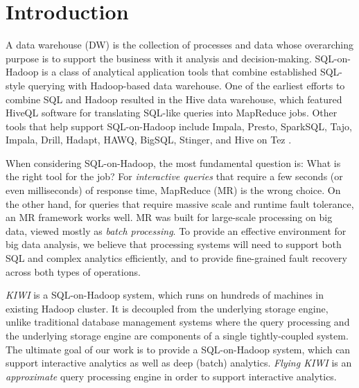 \documentclass{sig-alternate-05-2015}
\begin{document}


%
%

%
%
\printccsdesc



\section{Introduction}
A data warehouse (DW) is the collection of processes and data whose overarching purpose is to support the business with it analysis and decision-making. 
SQL-on-Hadoop is a class of analytical application tools that combine established SQL-style querying with Hadoop-based data warehouse.
One of the earliest efforts to combine SQL and Hadoop resulted in the Hive data warehouse, which featured HiveQL software for translating SQL-like queries into MapReduce jobs. Other tools that help support SQL-on-Hadoop include Impala, Presto, SparkSQL, Tajo, Impala, Drill, Hadapt, HAWQ, BigSQL, Stinger, and Hive on Tez \cite{Babcock:2003, Chaudhuri:2007, Zeng:2015, Floratou:2014, Agarwal:2014, Agarwal:2013}.

When considering SQL-on-Hadoop, the most fundamental question is: What is the right tool for the job? For \textit{interactive queries} that require a few seconds (or even milliseconds) of response time, MapReduce (MR) is the wrong choice. On the other hand, for queries that require massive scale and runtime fault tolerance, an MR framework works well. MR was built for large-scale processing on big data, viewed mostly as \textit{batch processing}.
To provide an effective environment for big data analysis, we believe that processing systems will need to support both SQL and complex analytics efficiently, and to provide fine-grained fault recovery across both types of operations.

\textit{KIWI} is a  SQL-on-Hadoop system, which runs on hundreds of machines in existing Hadoop cluster.
It is decoupled from the underlying storage engine, unlike traditional database management systems where the query processing and the underlying storage engine are components of a single tightly-coupled system.
The ultimate goal of our work is to provide a SQL-on-Hadoop system, which can support interactive analytics as well as deep (batch) analytics. \textit{Flying KIWI} is an \textit{approximate} query processing engine in order to support interactive analytics.
\end{document}
